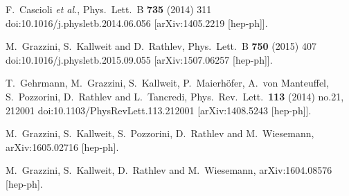


  F.~Cascioli {\it et al.},
  Phys.\ Lett.\ B {\bf 735} (2014) 311
  doi:10.1016/j.physletb.2014.06.056
  [arXiv:1405.2219 [hep-ph]].

  M.~Grazzini, S.~Kallweit and D.~Rathlev,
  Phys.\ Lett.\ B {\bf 750} (2015) 407
  doi:10.1016/j.physletb.2015.09.055
  [arXiv:1507.06257 [hep-ph]].



  T.~Gehrmann, M.~Grazzini, S.~Kallweit, P.~Maierhöfer, A.~von Manteuffel, S.~Pozzorini, D.~Rathlev and L.~Tancredi,
  Phys.\ Rev.\ Lett.\  {\bf 113} (2014) no.21,  212001
  doi:10.1103/PhysRevLett.113.212001
  [arXiv:1408.5243 [hep-ph]].

  M.~Grazzini, S.~Kallweit, S.~Pozzorini, D.~Rathlev and M.~Wiesemann,
  arXiv:1605.02716 [hep-ph].

  M.~Grazzini, S.~Kallweit, D.~Rathlev and M.~Wiesemann,
  arXiv:1604.08576 [hep-ph].


